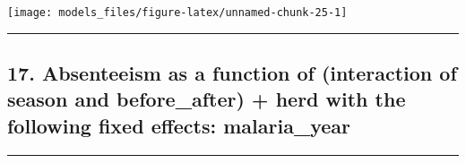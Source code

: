 \documentclass[]{article}
\begin{document}
\begin{center}\texttt{[image: models\_files/figure-latex/unnamed-chunk-25-1]} \end{center}

\newpage

\begin{center}\rule{0.5\linewidth}{\linethickness}\end{center}

\subsection{17. Absenteeism as a function of (interaction of season and
before\_after) + herd with the following fixed effects:
malaria\_year}\label{absenteeism-as-a-function-of-interaction-of-season-and-before_after-herd-with-the-following-fixed-effects-malaria_year}

\begin{center}\rule{0.5\linewidth}{\linethickness}\end{center}
\end{document}
